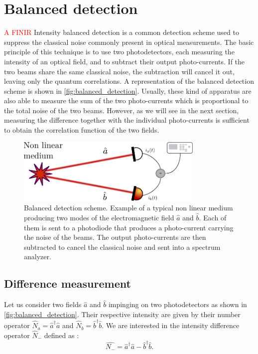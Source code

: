 \section{Balanced detection}
\textcolor{red}{A FINIR}
Intensity balanced detection is a common detection scheme used to suppress the classical noise commonly present in optical measurements.
The basic principle of this technique is to use two photodetectors, each measuring the intensity of an optical field, and to subtract their output photo-currents. If the two 
beams share the same classical noise, the subtraction will cancel it out, leaving only the quantum correlations. A representation of the balanced detection scheme is shown in \autoref{fig:balanced_detection}.
Usually, these kind of apparatus are also able to measure the sum of the two photo-currents which is proportional to the total noise of the two beams. However,
as we will see in the next section, measuring the difference together with the individual photo-currents is sufficient to obtain the correlation function of the two fields.
\begin{figure}
    \centering
    \includegraphics[width=0.8\textwidth]{chap_correlation/fig/balanced_detection.pdf}
    \caption{Balanced detection scheme. Example of a typical non linear medium producing two modes of the electromagnetic field $\hat{a}$ and $\hat{b}$. Each of them is sent to a photodiode that produces a photo-current carrying the noise
    of the beams. The output photo-currents are then subtracted to cancel the classical noise and sent into a spectrum analyzer.}
    \label{fig:balanced_detection}
\end{figure} 

\subsection{Difference measurement}
Let us consider two fields $\hat{a}$ and $\hat{b}$ impinging on two photodetectors as shown in \autoref{fig:balanced_detection}. Their respective intensity 
are given by their number operator $\hat{N}_a=\hat{a}^\dagger\hat{a}$ and $\hat{N}_b=\hat{b}^\dagger\hat{b}$.
We are interested in the intensity difference operator $\hat{N}_-$ defined as :
\begin{equation}
    \label{eq:diff_op}
    \hat{N_-} = \hat{a}^\dagger\hat{a} - \hat{b}^\dagger\hat{b}.
\end{equation}

